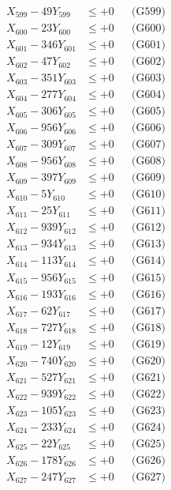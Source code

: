 \documentclass[a4paper,10pt]{article}
\begin{document}
{\begin{align}
X_{599} - 49Y_{599} &\leq +0 && \text{(G599)} \\
X_{600} - 23Y_{600} &\leq +0 && \text{(G600)} \\
\allowbreak
X_{601} - 346Y_{601} &\leq +0 && \text{(G601)} \\
X_{602} - 47Y_{602} &\leq +0 && \text{(G602)} \\
X_{603} - 351Y_{603} &\leq +0 && \text{(G603)} \\
X_{604} - 277Y_{604} &\leq +0 && \text{(G604)} \\
X_{605} - 306Y_{605} &\leq +0 && \text{(G605)} \\
X_{606} - 956Y_{606} &\leq +0 && \text{(G606)} \\
X_{607} - 309Y_{607} &\leq +0 && \text{(G607)} \\
X_{608} - 956Y_{608} &\leq +0 && \text{(G608)} \\
X_{609} - 397Y_{609} &\leq +0 && \text{(G609)} \\
X_{610} - 5Y_{610} &\leq +0 && \text{(G610)} \\
\allowbreak
X_{611} - 25Y_{611} &\leq +0 && \text{(G611)} \\
X_{612} - 939Y_{612} &\leq +0 && \text{(G612)} \\
X_{613} - 934Y_{613} &\leq +0 && \text{(G613)} \\
X_{614} - 113Y_{614} &\leq +0 && \text{(G614)} \\
X_{615} - 956Y_{615} &\leq +0 && \text{(G615)} \\
X_{616} - 193Y_{616} &\leq +0 && \text{(G616)} \\
X_{617} - 62Y_{617} &\leq +0 && \text{(G617)} \\
X_{618} - 727Y_{618} &\leq +0 && \text{(G618)} \\
X_{619} - 12Y_{619} &\leq +0 && \text{(G619)} \\
X_{620} - 740Y_{620} &\leq +0 && \text{(G620)} \\
\allowbreak
X_{621} - 527Y_{621} &\leq +0 && \text{(G621)} \\
X_{622} - 939Y_{622} &\leq +0 && \text{(G622)} \\
X_{623} - 105Y_{623} &\leq +0 && \text{(G623)} \\
X_{624} - 233Y_{624} &\leq +0 && \text{(G624)} \\
X_{625} - 22Y_{625} &\leq +0 && \text{(G625)} \\
X_{626} - 178Y_{626} &\leq +0 && \text{(G626)} \\
X_{627} - 247Y_{627} &\leq +0 && \text{(G627)} \\

\end{align}}
\end{document}
